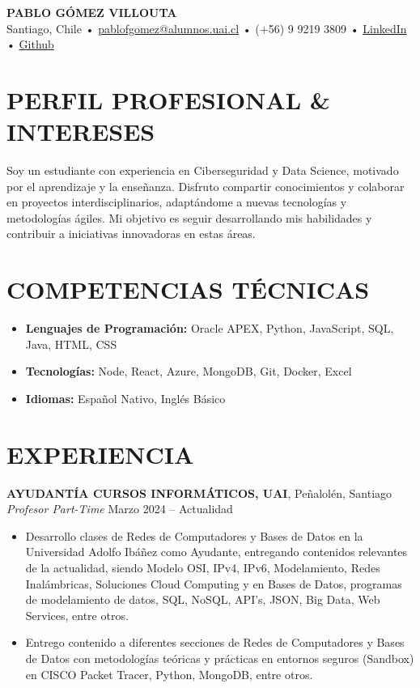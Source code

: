 \documentclass[a4paper,10pt]{article}
\begin{document}
\begin{center}
    {\LARGE \textbf{PABLO GÓMEZ VILLOUTA}} \\
    Santiago, Chile • \href{mailto:pablofgomez@alumnos.uai.cl}{pablofgomez@alumnos.uai.cl} • (+56) 9 9219 3809 • \href{https://www.linkedin.com/in/pablo-g%C3%B3mez-villouta-601868288/}{LinkedIn} • \href{https://github.com/PabloGomez-97}{Github}
\end{center}

\vspace{1em}

\section*{PERFIL PROFESIONAL \& INTERESES}
Soy un estudiante con experiencia en Ciberseguridad y Data Science, motivado por el aprendizaje y la enseñanza. Disfruto compartir conocimientos y colaborar en proyectos interdisciplinarios, adaptándome a nuevas tecnologías y metodologías ágiles. Mi objetivo es seguir desarrollando mis habilidades y contribuir a iniciativas innovadoras en estas áreas.


\section*{COMPETENCIAS TÉCNICAS}
\begin{itemize}[noitemsep]
    \item \textbf{Lenguajes de Programación:} Oracle APEX, Python, JavaScript, SQL, Java, HTML, CSS
    \item \textbf{Tecnologías:} Node, React, Azure, MongoDB, Git, Docker, Excel
    \item \textbf{Idiomas:} Español Nativo, Inglés Básico
\end{itemize}

\section*{EXPERIENCIA}
\textbf{AYUDANTÍA CURSOS INFORMÁTICOS, UAI}, Peñalolén, Santiago \\
\textit{Profesor Part-Time} \hfill Marzo 2024 – Actualidad
\begin{itemize}[noitemsep]
    \item Desarrollo clases de Redes de Computadores y Bases de Datos en la Universidad Adolfo Ibáñez como Ayudante, entregando contenidos relevantes de la actualidad, siendo Modelo OSI, IPv4, IPv6, Modelamiento, Redes Inalámbricas, Soluciones Cloud Computing y en Bases de Datos, programas de modelamiento de datos, SQL, NoSQL, API’s, JSON, Big Data, Web Services, entre otros.
    \item Entrego contenido a diferentes secciones de Redes de Computadores y Bases de Datos con metodologías teóricas y prácticas en entornos seguros (Sandbox) en CISCO Packet Tracer, Python, MongoDB, entre otros.
\end{itemize}
\end{document}
